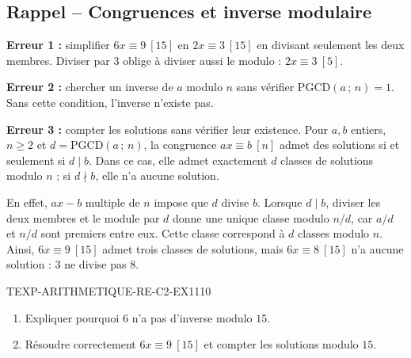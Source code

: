 

\subsection*{Rappel -- Congruences et inverse modulaire}

\textbf{Erreur 1 :} simplifier $6x\equiv9\ [15]$ en $2x\equiv3\ [15]$ en
divisant seulement les deux membres. Diviser par $3$ oblige à diviser aussi le
modulo : $2x\equiv3\ [5]$.

\textbf{Erreur 2 :} chercher un inverse de $a$ modulo $n$ sans vérifier
$\mathrm{PGCD}(a\,;\,n)=1$. Sans cette condition, l'inverse n'existe pas.

\textbf{Erreur 3 :} compter les solutions sans vérifier leur existence.
Pour $a,b$ entiers, $n\geq2$ et $d=\mathrm{PGCD}(a\,;\,n)$, la congruence
$ax\equiv b\ [n]$ admet des solutions si et seulement si $d\mid b$.
Dans ce cas, elle admet exactement $d$ classes de solutions modulo $n$ ;
si $d\nmid b$, elle n'a aucune solution.

En effet, $ax-b$ multiple de $n$ impose que $d$ divise $b$. Lorsque $d\mid b$,
diviser les deux membres et le module par $d$ donne une unique classe modulo
$n/d$, car $a/d$ et $n/d$ sont premiers entre eux. Cette classe correspond à
$d$ classes modulo $n$.
Ainsi, $6x\equiv9\ [15]$ admet trois classes de solutions, mais
$6x\equiv8\ [15]$ n'a aucune solution : $3$ ne divise pas $8$.


\begin{exercice}{TEXP-ARITHMETIQUE-RE-C2-EX1}{1}{10}
\begin{enumerate}
  \item Expliquer pourquoi $6$ n'a pas d'inverse modulo $15$.
  \item Résoudre correctement $6x\equiv9\ [15]$ et compter les solutions
        modulo $15$.
\end{enumerate}
\end{exercice}
